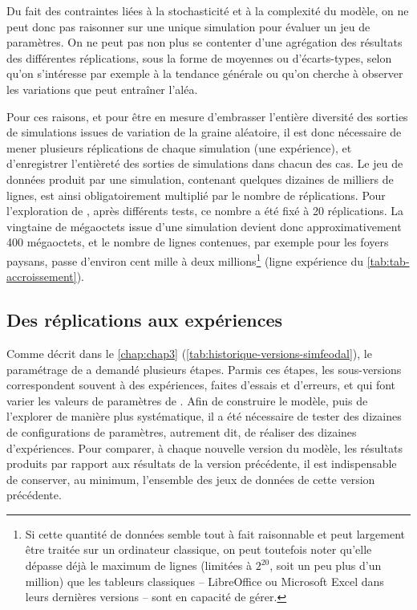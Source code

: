 Du fait des contraintes liées à la stochasticité et à la complexité du modèle, on ne peut donc pas raisonner sur une unique simulation pour évaluer un jeu de paramètres.
On ne peut pas non plus se contenter d'une agrégation des résultats des différentes réplications, sous la forme de moyennes ou d'écarts-types, selon qu'on s'intéresse par exemple à la tendance générale ou qu'on cherche à observer les variations que peut entraîner l'aléa.

Pour ces raisons, et pour être en mesure d'embrasser l'entière diversité des sorties de simulations issues de variation de la graine aléatoire, il est donc nécessaire de mener plusieurs réplications de chaque simulation (une expérience), et d'enregistrer l'entièreté des sorties de simulations dans chacun des cas.
Le jeu de données produit par une simulation, contenant quelques dizaines de milliers de lignes, est ainsi obligatoirement multiplié par le nombre de réplications.
Pour l'exploration de \simfeodal{}, après différents tests, ce nombre a été fixé à 20 réplications.
La vingtaine de mégaoctets issue d'une simulation devient donc approximativement 400 mégaoctets, et le nombre de lignes contenues, par exemple pour les foyers paysans, passe d'environ cent mille à deux millions\footnote{
	Si cette quantité de données semble tout à fait raisonnable et peut largement être traitée sur un ordinateur classique, on peut toutefois noter qu'elle dépasse déjà le maximum de lignes (limitées à $2^{20}$, soit un peu plus d'un million) que les tableurs classiques -- LibreOffice ou Microsoft Excel dans leurs dernières versions -- sont en capacité de gérer.
} (ligne \og expérience\fg{} du \cref{tab:tab-accroissement}).

\subsection{Des réplications aux expériences}\label{subsec:capter-experiences}

Comme décrit dans le \cref{chap:chap3} (\cref{tab:historique-versions-simfeodal}), le paramétrage de \simfeodal{} a demandé plusieurs étapes.
Parmis ces étapes, les \og sous-versions\fg{} correspondent souvent à des \og expériences\fg{}, faites d'essais et d'erreurs, et qui font varier les valeurs de paramètres de \simfeodal{}.
Afin de construire le modèle, puis de l'explorer de manière plus systématique, il a été nécessaire de tester des dizaines de configurations de paramètres, autrement dit, de réaliser des dizaines d'expériences.
Pour comparer, à chaque nouvelle version du modèle, les résultats produits par rapport aux résultats de la version précédente, il est indispensable de conserver, au minimum, l'ensemble des jeux de données de cette version précédente.

